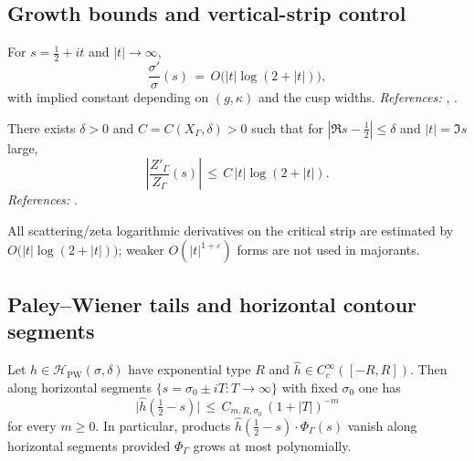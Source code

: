 \subsection{Growth bounds and vertical-strip control} %
\label{subsec:ch4-part1-growth} \relax

\begin{lemma}
\label{lem:sigma-growth}
For $s=\tfrac12+it$ and $|t|\to\infty$,
\[
  \frac{\sigma'}{\sigma}(s) \,=\, O\big(|t|\log(2+|t|)\big),
\]
with implied constant depending on $(g,\kappa)$ and the cusp widths. \emph{References:} \cite[Ch.~6]{Hejhal1983vol2}, \cite[§5.3]{IwaniecKowalski2004}. \relax
\end{lemma}

\begin{lemma}
\label{lem:Zprime-vertical}
There exists $\delta>0$ and $C=C(X_\Gamma,\delta)>0$ such that for $|\Re s-\tfrac12|\le \delta$ and $|t|=\Im s$ large,
\[
  \left|\frac{Z'_\Gamma}{Z_\Gamma}(s)\right| \,\le\, C\,|t|\log(2+|t|).
\]
\emph{References:} \cite[Ch.~11–12]{Hejhal1983vol2}. \relax
\end{lemma}

\begin{invariant}
\label{inv:C6}
All scattering/zeta logarithmic derivatives on the critical strip are estimated by $O\big(|t|\log(2+|t|)\big)$; weaker $O(|t|^{1+\varepsilon})$ forms are not used in majorants. \relax
\end{invariant}

\subsection{Paley–Wiener tails and horizontal contour segments} %
\label{subsec:ch4-part1-PW-tails} \relax

\begin{lemma}
\label{lem:PW-tail}
Let $h\in\mathcal{H}_{\mathrm{PW}}(\sigma,\delta)$ have exponential type $R$ and $\widehat{h}\in C_c^\infty([-R,R])$. Then along horizontal segments $\{s=\sigma_0\pm iT: T\to\infty\}$ with fixed $\sigma_0$ one has
\[
  \big|\widehat{h}(\tfrac12 - s)\big| \,\le\, C_{m,R,\sigma_0}\,(1+|T|)^{-m}
\]
for every $m\ge 0$. In particular, products $\widehat{h}(\tfrac12-s)\cdot \Phi_\Gamma(s)$ vanish along horizontal segments provided $\Phi_\Gamma$ grows at most polynomially. \relax
\end{lemma}

